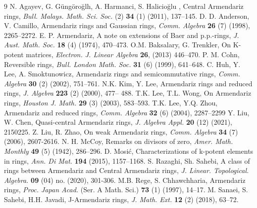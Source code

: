 \documentclass[12pt]{amsart}
\theoremstyle{plain}
\theoremstyle{definition}
\theoremstyle{remark}
\numberwithin{equation}{section}
\begin{document}
	\begin{thebibliography}{9}
		N. Agayev, G. Güngöroğlh, A. Harmanci, S. Halicioğlu , Central Armendariz rings, \textit{Bull. Malays. Math. Sci. Soc.} (2) \textbf{34} (1) (2011), 137–145.
		D. D. Anderson, V. Camillo, Armendariz rings and Gaussian rings, \textit{Comm. Algebra} \textbf{26} (7) (1998), 2265–2272.
		E. P. Armendariz, A note on extensions of Baer and p.p.-rings, \textit{J. Aust. Math. Soc.}
		\textbf{18} (4) (1974), 470–473.
		O.M. Baksalary, G. Trenkler, On K-potent matrices, \textit{Electron. J. Linear Algebra} \textbf{26}, (2013) 446–470.
		P. M. Cohn, Reversible rings, \textit{Bull. London Math. Soc.} \textbf{31} (6) (1999), 641–648.
		C. Huh, Y. Lee, A. Smoktunowicz, Armendariz rings and semicommutative rings,
		\textit{Comm. Algebra} \textbf{30} (2) (2002), 751–761.
		N.K. Kim, Y. Lee, Armendariz rings and reduced rings, \textit{J. Algebra} \textbf{223} (2) (2000), 477–
		488.
		T.K. Lee, T.L. Wong, On Armendariz rings, \textit{Houston J. Math.} \textbf{29} (3) (2003), 583–593.
		T.K. Lee, Y.Q. Zhou, Armendariz and reduced rings, \textit{Comm. Algebra} \textbf{32} (6) (2004),
		2287–2299
		Y. Liu, W. Chen, Quasi-central Armendariz rings, \textit{J. Algebra Appl.} \textbf{20} (12) (2021), 2150225.
		Z. Liu, R. Zhao, On weak Armendariz rings, \textit{Comm. Algebra} \textbf{34} (7) (2006), 2607-2616.
		N. H. McCoy, Remarks on divisors of zero, \textit{Amer. Math. Monthly} \textbf{49} (5) (1942), 286–296.
		D. Mosić, Characterizations of k-potent elements in rings, \textit{Ann. Di Mat.} \textbf{194} (2015), 1157–1168.
		S. Razaghi, Sh. Sahebi, A class of rings between Armendariz and Central Armendariz rings, \textit{J. Linear. Topological. Algebra.} \textbf{09} (04) no. (2020), 301-306.
		M.B. Rege, S. Chhawchharia, Armendariz rings, \textit{Proc. Japan Acad.} (Ser. A Math. Sci.) \textbf{73} (1) (1997), 14–17. 
		M. Sanaei, S. Sahebi, H.H. Javadi, J-Armendariz rings, \textit{J. Math. Ext.} \textbf{12} (2) (2018), 63–72.
	\end{thebibliography}
\end{document}
